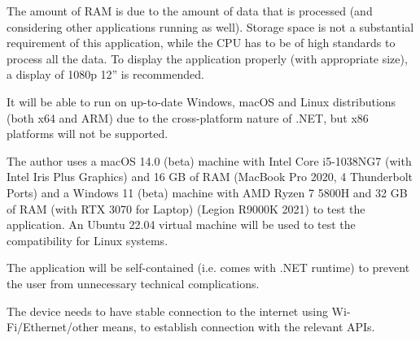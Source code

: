 The amount of RAM is due to the amount of data that is processed (and considering other applications running as well). Storage space is not a substantial requirement of this application, while the CPU has to be of high standards to process all the data. To display the application properly (with appropriate size), a display of 1080p 12'' is recommended.

It will be able to run on up-to-date Windows, macOS and Linux distributions (both x64 and ARM) due to the cross-platform nature of .NET, but x86 platforms will not be supported.

The author uses a macOS 14.0 (beta) machine with Intel Core i5-1038NG7 (with Intel Iris Plus Graphics) and 16 GB of RAM (MacBook Pro 2020, 4 Thunderbolt Ports) and a Windows 11 (beta) machine with AMD Ryzen 7 5800H and 32 GB of RAM (with RTX 3070 for Laptop) (Legion R9000K 2021) to test the application. An Ubuntu 22.04 virtual machine will be used to test the compatibility for Linux systems.

The application will be self-contained (i.e. comes with .NET runtime) to prevent the user from unnecessary technical complications.

The device needs to have stable connection to the internet using Wi-Fi/Ethernet/other means, to establish connection with the relevant APIs.